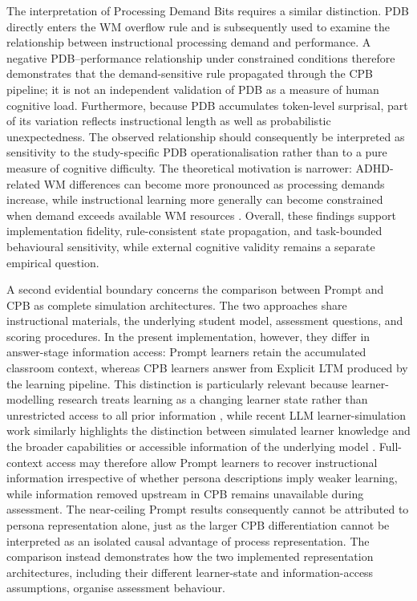 The interpretation of Processing Demand Bits requires a similar distinction. PDB directly enters the WM overflow rule and is subsequently used to examine the relationship between instructional processing demand and performance. A negative PDB--performance relationship under constrained conditions therefore demonstrates that the demand-sensitive rule propagated through the CPB pipeline; it is not an independent validation of PDB as a measure of human cognitive load. Furthermore, because PDB accumulates token-level surprisal, part of its variation reflects instructional length as well as probabilistic unexpectedness. The observed relationship should consequently be interpreted as sensitivity to the study-specific PDB operationalisation rather than to a pure measure of cognitive difficulty. The theoretical motivation is narrower: ADHD-related WM differences can become more pronounced as processing demands increase, while instructional learning more generally can become constrained when demand exceeds available WM resources \cite{kofler2010adhd,sweller-etal-2019-cognitive}. Overall, these findings support implementation fidelity, rule-consistent state propagation, and task-bounded behavioural sensitivity, while external cognitive validity remains a separate empirical question.

A second evidential boundary concerns the comparison between Prompt and CPB as complete simulation architectures. The two approaches share instructional materials, the underlying student model, assessment questions, and scoring procedures. In the present implementation, however, they differ in answer-stage information access: Prompt learners retain the accumulated classroom context, whereas CPB learners answer from Explicit LTM produced by the learning pipeline. This distinction is particularly relevant because learner-modelling research treats learning as a changing learner state rather than unrestricted access to all prior information \cite{abdelrahman-etal-2023-knowledge,corbett-anderson-1995-knowledge}, while recent LLM learner-simulation work similarly highlights the distinction between simulated learner knowledge and the broader capabilities or accessible information of the underlying model \cite{yuan-etal-2026-towards}. Full-context access may therefore allow Prompt learners to recover instructional information irrespective of whether persona descriptions imply weaker learning, while information removed upstream in CPB remains unavailable during assessment. The near-ceiling Prompt results consequently cannot be attributed to persona representation alone, just as the larger CPB differentiation cannot be interpreted as an isolated causal advantage of process representation. The comparison instead demonstrates how the two implemented representation architectures, including their different learner-state and information-access assumptions, organise assessment behaviour.

